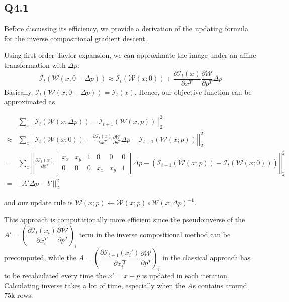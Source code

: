 \documentclass{article} %
\begin{document}
    \subsection*{Q4.1}
    Before discussing its efficiency, we provide a derivation of the updating formula for the inverse compositional gradient descent.

    Using first-order Taylor expansion, we can approximate the image under an affine transformation with $\Delta p$:
    $$\mathcal{I}_{t}\left(\mathcal{W}\left(x;0+\Delta p\right)\right)\approx \mathcal{I}_{t}\left(\mathcal{W}\left(x;0\right)\right)+\frac{\partial \mathcal{I}_{t}\left(x\right)}{\partial x^{T}}\frac{\partial \mathcal{W}}{\partial p^{T}}\Delta p$$
    Basically, $\mathcal{I}_{t}\left(\mathcal{W}\left(x;0+\Delta p\right)\right)=\mathcal{I}_{t}\left(x\right)$. Hence, our objective function can be approximated as


    \begin{align*}
    &\sum _{x}{\left| \left| \mathcal{I}_{t}\left(\mathcal{W}\left(x;\Delta p\right)\right)-\mathcal{I}_{t+1}\left(\mathcal{W}\left(x;p\right)\right)\right| \right| }_{2}^{2}\\
    \approx&\sum _{x}{\left| \left| \mathcal{I}_{t}\left(\mathcal{W}\left(x;0\right)\right)+\frac{\partial \mathcal{I}_{t}\left(x\right)}{\partial x^{T}}\frac{\partial \mathcal{W}}{\partial p^{T}}\Delta p-\mathcal{I}_{t+1}\left(\mathcal{W}\left(x;p\right)\right)\right| \right| }_{2}^{2}\\
    =&\sum _{x}{\left| \left| \frac{\partial \mathcal{I}_{t}\left(x\right)}{\partial x^{T}}\begin{bmatrix}
    x_{x} & x_{y} & 1 & 0 & 0 & 0\\
    0 & 0 & 0 & x_{x} & x_{y} & 1
    \end{bmatrix}\Delta p-\left(\mathcal{I}_{t+1}\left(\mathcal{W}\left(x;p\right)\right)-\mathcal{I}_{t}\left(\mathcal{W}\left(x;0\right)\right)\right)\right| \right| }_{2}^{2}\\
    =&{\left| \left| A'\Delta p-b'\right| \right| }_{2}^{2}
    \end{align*}

    and our update rule is $\mathcal{W}\left(x;p\right)\leftarrow \mathcal{W}\left(x;p\right)\circ \mathcal{W}\left(x;\Delta p\right)^{-1}$. 
    \medskip

    This approach is computationally more efficient since the pseudoinverse of the $A'=\left(\dfrac{\partial \mathcal{I}_{t}\left(x_{i}\right)}{\partial {x}_{i}^{T}}\dfrac{\partial \mathcal{W}}{\partial p^{T}}\right)_{i}$ term in the inverse compositional method can be precomputed, while the $A=\left(\dfrac{\partial \mathcal{I}_{t+1}\left(x_{i}'\right)}{\partial {x}_{i}^{'T}}\dfrac{\partial \mathcal{W}}{\partial p^{T}}\right)_{i}$ in the classical approach has to be recalculated every time the $x'=x+p$ is updated in each iteration. Calculating inverse takes a lot of time, especially when the $A$s contains around 75k rows.
    \medskip
\end{document}
